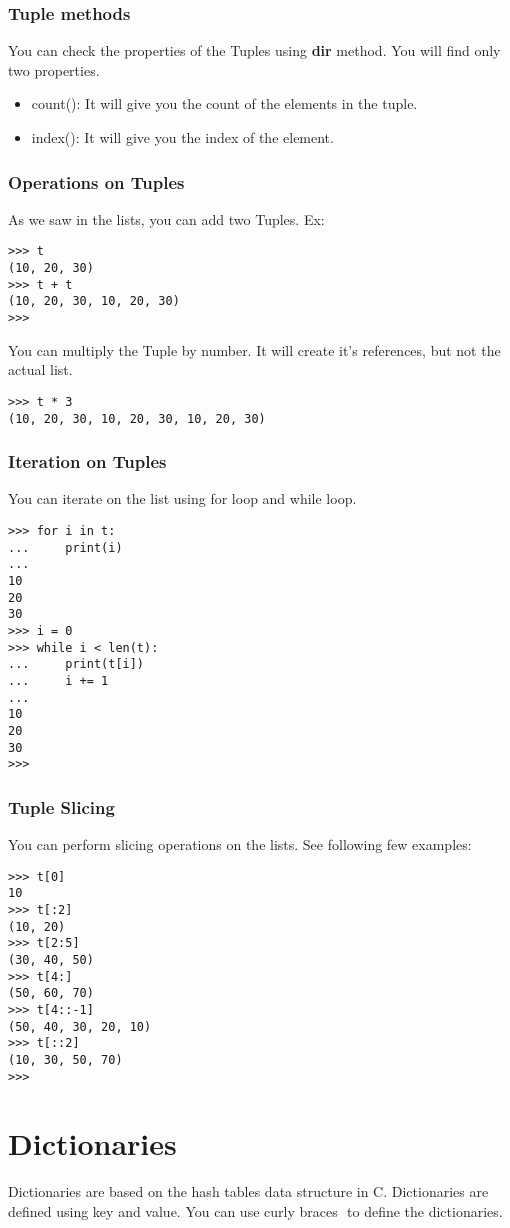 \documentclass[letterpaper,12pt]{book}
\begin{document}
\subsubsection{Tuple methods}
You can check the properties of the Tuples using \textbf{dir} method. You will find only two properties.
\begin{itemize}
\item count(): It will give you the count of the elements in the tuple.
\item index(): It will give you the index of the element.
\end{itemize}
\subsubsection{Operations on Tuples}
As we saw in the lists, you can add two Tuples. Ex:
\begin{lstlisting}
>>> t
(10, 20, 30)
>>> t + t
(10, 20, 30, 10, 20, 30)
>>>
\end{lstlisting}
You can multiply the Tuple by number. It will create it's references, but not the actual list.
\begin{lstlisting}
>>> t * 3
(10, 20, 30, 10, 20, 30, 10, 20, 30)
\end{lstlisting}
\subsubsection{Iteration on Tuples}
You can iterate on the list using for loop and while loop.
\begin{lstlisting}
>>> for i in t:
...     print(i)
... 
10
20
30
>>> i = 0
>>> while i < len(t):
...     print(t[i])
...     i += 1
... 
10
20
30
>>> 
\end{lstlisting}
\subsubsection{Tuple Slicing}
You can perform slicing operations on the lists. See following few examples:
\begin{lstlisting}
>>> t[0]
10
>>> t[:2]
(10, 20)
>>> t[2:5]
(30, 40, 50)
>>> t[4:]
(50, 60, 70)
>>> t[4::-1]
(50, 40, 30, 20, 10)
>>> t[::2]
(10, 30, 50, 70)
>>> 
\end{lstlisting}
\section{Dictionaries}
Dictionaries are based on the hash tables data structure in C. Dictionaries are defined using key and value. You can use curly braces ${}$ to define the dictionaries.
\end{document}
